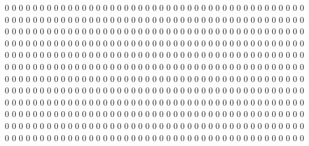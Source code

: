 0 0 0 0 0 0 0 0 0 0 0 0 0 0 0 0 0 0 0 0
0 0 0 0 0 0 0 0 0 0 0 0 0 0 0 0 0 0 0 0
0 0 0 0 0 0 0 0 0 0 0 0 0 0 0 0 0 0 0 0
0 0 0 0 0 0 0 0 0 0 0 0 0 0 0 0 0 0 0 0
0 0 0 0 0 0 0 0 0 0 0 0 0 0 0 0 0 0 0 0
0 0 0 0 0 0 0 0 0 0 0 0 0 0 0 0 0 0 0 0
0 0 0 0 0 0 0 0 0 0 0 0 0 0 0 0 0 0 0 0
0 0 0 0 0 0 0 0 0 0 0 0 0 0 0 0 0 0 0 0
0 0 0 0 0 0 0 0 0 0 0 0 0 0 0 0 0 0 0 0
0 0 0 0 0 0 0 0 0 0 0 0 0 0 0 0 0 0 0 0
0 0 0 0 0 0 0 0 0 0 0 0 0 0 0 0 0 0 0 0
0 0 0 0 0 0 0 0 0 0 0 0 0 0 0 0 0 0 0 0
0 0 0 0 0 0 0 0 0 0 0 0 0 0 0 0 0 0 0 0
0 0 0 0 0 0 0 0 0 0 0 0 0 0 0 0 0 0 0 0
0 0 0 0 0 0 0 0 0 0 0 0 0 0 0 0 0 0 0 0
0 0 0 0 0 0 0 0 0 0 0 0 0 0 0 0 0 0 0 0
0 0 0 0 0 0 0 0 0 0 0 0 0 0 0 0 0 0 0 0
0 0 0 0 0 0 0 0 0 0 0 0 0 0 0 0 0 0 0 0
0 0 0 0 0 0 0 0 0 0 0 0 0 0 0 0 0 0 0 0
0 0 0 0 0 0 0 0 0 0 0 0 0 0 0 0 0 0 0 0
0 0 0 0 0 0 0 0 0 0 0 0 0 0 0 0 0 0 0 0
0 0 0 0 0 0 0 0 0 0 0 0 0 0 0 0 0 0 0 0
0 0 0 0 0 0 0 0 0 0 0 0 0 0 0 0 0 0 0 0
0 0 0 0 0 0 0 0 0 0 0 0 0 0 0 0 0 0 0 0
0 0 0 0 0 0 0 0 0 0 0 0 0 0 0 0 0 0 0 0
0 0 0 0 0 0 0 0 0 0 0 0 0 0 0 0
